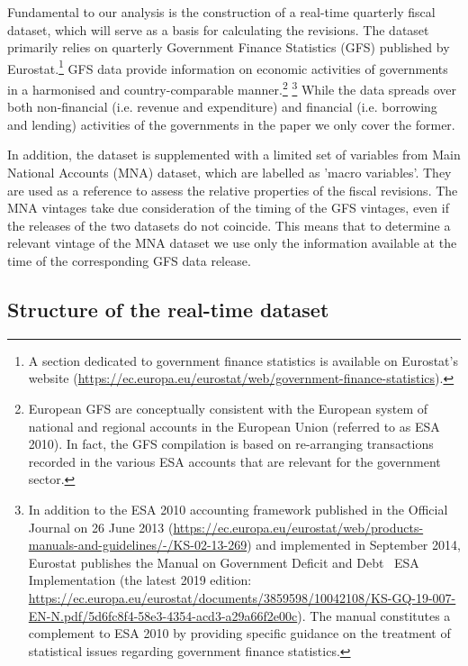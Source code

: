 Fundamental to our analysis is the construction of a real-time quarterly
fiscal dataset, which will serve as a basis for calculating the revisions.
The dataset primarily relies on quarterly Government Finance Statistics
(GFS) published by Eurostat.\footnote{A section dedicated to government finance statistics is available
on Eurostat's website (\url{https://ec.europa.eu/eurostat/web/government-finance-statistics}).} 
GFS data provide information on economic activities of governments
in a harmonised and country-comparable manner.\footnote{European GFS are conceptually consistent 
with the European system of national and regional accounts in the European Union (referred
to as ESA 2010). In fact, the GFS compilation is based on re-arranging
transactions recorded in the various ESA accounts that are relevant
for the government sector.} \footnote{In addition to the ESA 2010 accounting framework published in the Official
Journal on 26 June 2013 (\url{https://ec.europa.eu/eurostat/web/products-manuals-and-guidelines/-/KS-02-13-269})
and implemented in September 2014, Eurostat publishes the Manual on
Government Deficit and Debt \textemdash~ESA Implementation (the latest 2019
edition: \url{https://ec.europa.eu/eurostat/documents/3859598/10042108/KS-GQ-19-007-EN-N.pdf/5d6fc8f4-58e3-4354-acd3-a29a66f2e00c}).
The manual constitutes a complement to ESA 2010 by providing specific
guidance on the treatment of statistical issues regarding government
finance statistics.} While the data spreads over both non-financial (i.e. revenue and expenditure)
and financial (i.e. borrowing and lending) activities of the governments
in the paper we only cover the former.

In addition, the dataset is supplemented with a limited set of variables
from Main National Accounts (MNA) dataset, which are labelled as 'macro variables'. 
They are used as a reference to assess the relative properties of the fiscal revisions. The MNA vintages take
due consideration of the timing of the GFS vintages, even if the releases
of the two datasets do not coincide. This means that to determine
a relevant vintage of the MNA dataset we use only the information
available at the time of the corresponding GFS data release.

\subsection{Structure of the real-time dataset\label{subsec:Structure of the real-time dataset}}

